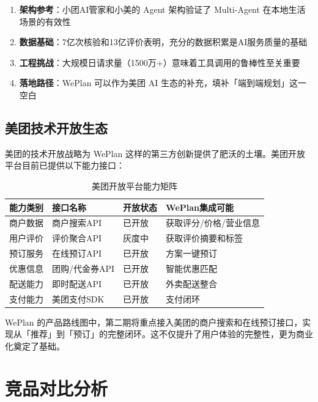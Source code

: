 \documentclass[12pt,a4paper]{ctexart}
\begin{document}
\begin{enumerate}[leftmargin=2em]
  \item \textbf{架构参考}：小团AI管家和小美的 Agent 架构验证了 Multi-Agent 在本地生活场景的有效性
  \item \textbf{数据基础}：7亿次核验和13亿评价表明，充分的数据积累是AI服务质量的基础
  \item \textbf{工程挑战}：大规模日请求量（1500万+）意味着工具调用的鲁棒性至关重要
  \item \textbf{落地路径}：WePlan 可以作为美团 AI 生态的补充，填补「端到端规划」这一空白
\end{enumerate}

\subsection{美团技术开放生态}

美团的技术开放战略为 WePlan 这样的第三方创新提供了肥沃的土壤。美团开放平台目前已提供以下能力接口：

\begin{table}[H]
\centering
\caption{美团开放平台能力矩阵}
\label{tab:meituan-open}
\renewcommand{\arraystretch}{1.3}
{\small
\begin{tabular}{p{3cm} p{3cm} p{2cm} p{4cm}}
\toprule
\textbf{能力类别} & \textbf{接口名称} & \textbf{开放状态} & \textbf{WePlan集成可能} \\
\midrule
商户数据 & 商户搜索API & 已开放 & 获取评分/价格/营业信息 \\
用户评价 & 评价聚合API & 灰度中 & 获取评价摘要和标签 \\
预订服务 & 在线预订API & 已开放 & 方案一键预订 \\
优惠信息 & 团购/代金券API & 已开放 & 智能优惠匹配 \\
配送能力 & 即时配送API & 已开放 & 外卖配送整合 \\
支付能力 & 美团支付SDK & 已开放 & 支付闭环 \\
\bottomrule
\end{tabular}
}
\end{table}

WePlan 的产品路线图中，第二期将重点接入美团的商户搜索和在线预订接口，实现从「推荐」到「预订」的完整闭环。这不仅提升了用户体验的完整性，更为商业化奠定了基础。

\newpage

\section{竞品对比分析}
\end{document}
